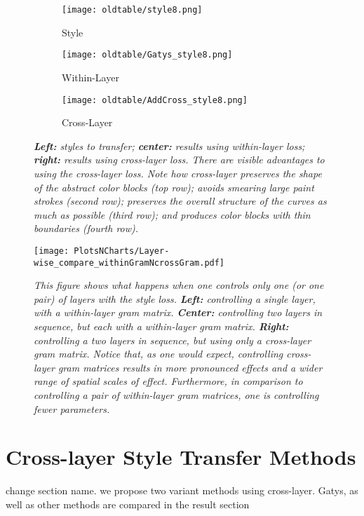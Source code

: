 \documentclass[runningheads]{llncs}
\begin{document}
\begin{figure}[!htbp]
  \begin{subfigure}[b]{0.3\linewidth}
    \texttt{[image: oldtable/style8.png]}
\caption{Style}
  \end{subfigure}
  \begin{subfigure}[b]{0.3\linewidth}
    \texttt{[image: oldtable/Gatys\_style8.png]}
\caption{Within-Layer}
  \end{subfigure}
  \begin{subfigure}[b]{0.3\linewidth}
    \texttt{[image: oldtable/AddCross\_style8.png]}
\caption{Cross-Layer}
  \end{subfigure} 
    \caption{\em {\bf Left:} styles to transfer; {\bf center:} results using within-layer
    loss; {\bf right:} results using cross-layer loss.  There are
    visible advantages to using the cross-layer loss. Note how cross-layer preserves the shape of the abstract color blocks (top row); 
avoids smearing large paint strokes (second row); preserves the overall structure of the curves as much as possible
(third row); and produces color blocks with thin boundaries (fourth row).
  }\label{fig:cf2}
\end{figure}

\begin{figure}[h]
\centering
\texttt{[image: PlotsNCharts/Layer-wise\_compare\_withinGramNcrossGram.pdf]}


\caption{\em This figure shows what happens when one controls only one (or one pair) of layers with the style loss.
{\bf Left:} controlling a single layer, with a within-layer gram matrix.  {\bf Center:} controlling two
layers in sequence, but each with a within-layer gram matrix.  {\bf Right:} controlling a two layers
in sequence, but using only a cross-layer gram matrix.  Notice that, as one would expect, controlling
cross-layer gram matrices results in more pronounced effects and a wider range of spatial scales of effect.
Furthermore, in comparison to controlling  a pair of within-layer gram matrices, one is controlling fewer
parameters.}
\label{fig:layer_wise}
\end{figure}


\section{Cross-layer Style Transfer Methods}\label{sec:Cross}
\todo change section name. we propose two variant methods using cross-layer. Gatys, as well as other methods are compared in the result section\\
\end{document}
